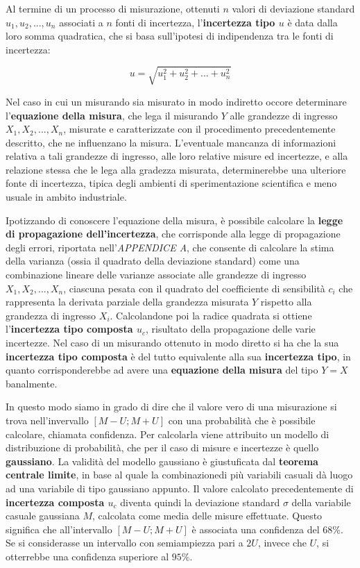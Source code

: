 \documentclass[a4paper, twoside]{article}
\begin{document}
Al termine di un processo di misurazione, ottenuti $n$ valori di deviazione standard $u_1, u_2, ..., u_n$ associati a $n$ fonti di incertezza, l'\textbf{incertezza tipo $u$}  è data dalla loro somma quadratica, che si basa sull'ipotesi di indipendenza tra le fonti di incertezza:

\begin{equation}
u = \sqrt{u_1^2 + u_2^2 + ... + u_n^2}
\end{equation}

Nel caso in cui un misurando sia misurato in modo indiretto occore determinare l'\textbf{equazione della misura}, che lega il misurando $Y$ alle grandezze di ingresso $X_1, X_2, ..., X_n$, misurate e caratterizzate con il procedimento precedentemente descritto, che ne influenzano la misura. L'eventuale mancanza di informazioni relativa a tali grandezze di ingresso, alle loro relative misure ed incertezze, e alla relazione stessa che le lega alla gradezza misurata, determinerebbe una ulteriore fonte di incertezza, tipica degli ambienti di sperimentazione scientifica e meno usuale in ambito industriale.\par
Ipotizzando di conoscere l'equazione della misura, è possibile calcolare la \textbf{legge di propagazione dell'incertezza}, che corrisponde alla legge di propagazione degli errori, riportata nell'\textit{APPENDICE A}, che consente di calcolare la stima della varianza (ossia il quadrato della deviazione standard) come una combinazione lineare delle varianze associate alle grandezze di ingresso $X_1, X_2, ..., X_n$, ciascuna pesata con il quadrato del coefficiente di sensibilità $c_i$ che rappresenta la derivata parziale della grandezza misurata $Y$ rispetto alla grandezza di ingresso $X_i$. Calcolandone poi la radice quadrata si ottiene l'\textbf{incertezza tipo composta $u_c$}, risultato della propagazione delle varie incertezze. Nel caso di un misurando ottenuto in modo diretto si ha che la sua \textbf{incertezza tipo composta} è del tutto equivalente alla sua \textbf{incertezza tipo}, in quanto corrisponderebbe ad avere una \textbf{equazione della misura} del tipo $Y=X$ banalmente.

In questo modo siamo in grado di dire che il valore vero di una misurazione si trova nell'invervallo $[M-U;M+U]$  con una probabilità che è possibile calcolare, chiamata confidenza. Per calcolarla viene attribuito un modello di distribuzione di probabilità, che per il caso di misure e incertezze è quello \textbf{gaussiano}. La validità del modello gaussiano è giustuficata dal \textbf{teorema centrale limite}, in base al quale la combinazionedi più variabili casuali dà luogo ad una variabile di tipo gaussiano appunto. Il valore calcolato precedentemente di \textbf{incertezza composta $u_c$} diventa quindi la deviazione standard $\sigma$ della variabile casuale gaussiana \textbf{$M$}, calcolata come media delle misure effettuate. Questo significa che all'intervallo $[M-U;M+U]$ è associata una confidenza del $68 \% $. Se si considerasse un intervallo con semiampiezza pari a $2U$, invece che $U$, si otterrebbe una confidenza superiore al $95 \%$. 
\end{document}
